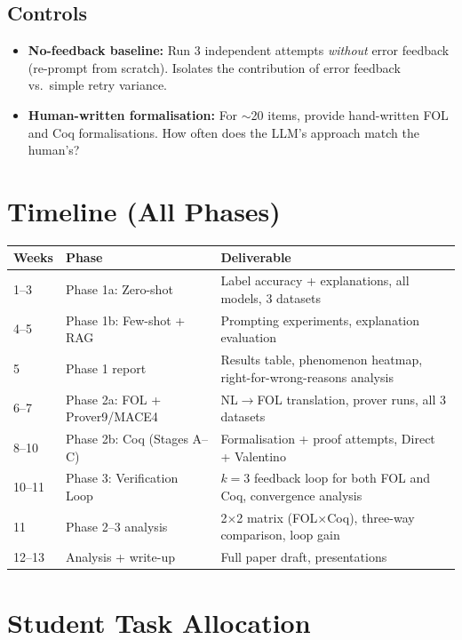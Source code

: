 \documentclass[11pt,a4paper]{article}
\begin{document}
\subsection{Controls}

\begin{itemize}[nosep,leftmargin=1.5em]
\item \textbf{No-feedback baseline:} Run 3 independent attempts \emph{without} error feedback (re-prompt from scratch). Isolates the contribution of error feedback vs.\ simple retry variance.
\item \textbf{Human-written formalisation:} For $\sim$20 items, provide hand-written FOL and Coq formalisations. How often does the LLM's approach match the human's?
\end{itemize}

\section{Timeline (All Phases)}

\begin{table}[h!]
\centering\small
\begin{tabular}{l l l}
\toprule
\textbf{Weeks} & \textbf{Phase} & \textbf{Deliverable} \\
\midrule
1--3 & Phase 1a: Zero-shot & Label accuracy + explanations, all models, 3 datasets \\
4--5 & Phase 1b: Few-shot + RAG & Prompting experiments, explanation evaluation \\
5 & Phase 1 report & Results table, phenomenon heatmap, right-for-wrong-reasons analysis \\
6--7 & Phase 2a: FOL + Prover9/MACE4 & NL$\to$FOL translation, prover runs, all 3 datasets \\
8--10 & Phase 2b: Coq (Stages A--C) & Formalisation + proof attempts, Direct + Valentino \\
10--11 & Phase 3: Verification Loop & $k{=}3$ feedback loop for both FOL and Coq, convergence analysis \\
11 & Phase 2--3 analysis & 2$\times$2 matrix (FOL$\times$Coq), three-way comparison, loop gain \\
12--13 & Analysis + write-up & Full paper draft, presentations \\
\bottomrule
\end{tabular}
\end{table}

\section{Student Task Allocation}
\end{document}
